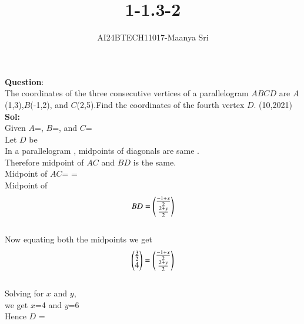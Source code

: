 \documentclass[journal]{IEEEtran}
\begin{document}

\vspace{3cm}

\title{1-1.3-2}
\author{AI24BTECH11017-Maanya Sri
}
{\let\newpage\relax\maketitle}

\renewcommand{\thefigure}{\theenumi}
\renewcommand{\thetable}{\theenumi}
\setlength{\intextsep}{10pt} %


\renewcommand{\thetable}{\theenumi}
\textbf{Question}:\\
The coordinates of the three consecutive vertices of a parallelogram $ABCD$ are $A$ (1,3),$B$(-1,2), and $C$(2,5).Find the coordinates of the fourth vertex $D$.
\hfill(10,2021)
\\ \textbf{Sol:}
\\ Given $A$=,
$B$=, and
$C$=
\\ Let $D$ be 
\\ In a parallelogram , midpoints of diagonals are same .
\\ Therefore midpoint of $AC$ and $BD$ is the same.
\\  Midpoint of $AC$= = 
\\ Midpoint of
\begin{align}
	BD=\begin{pmatrix}
\frac{-1+x}{2}
\\
\frac{2+y}{2}
\end{pmatrix}\end{align}
\\ Now equating both the midpoints we get
\\\begin{align} \begin{pmatrix}
\frac{3}{2}
\\
4
\end{pmatrix} = \begin{pmatrix}
\frac{-1+x}{2}
\\
\frac{2+y}{2}
\end{pmatrix}\end{align}
\\ Solving for $x$ and $y$,
\\ we get $x$=4 and $y$=6
\\ Hence $D$ = 
\end{document}
